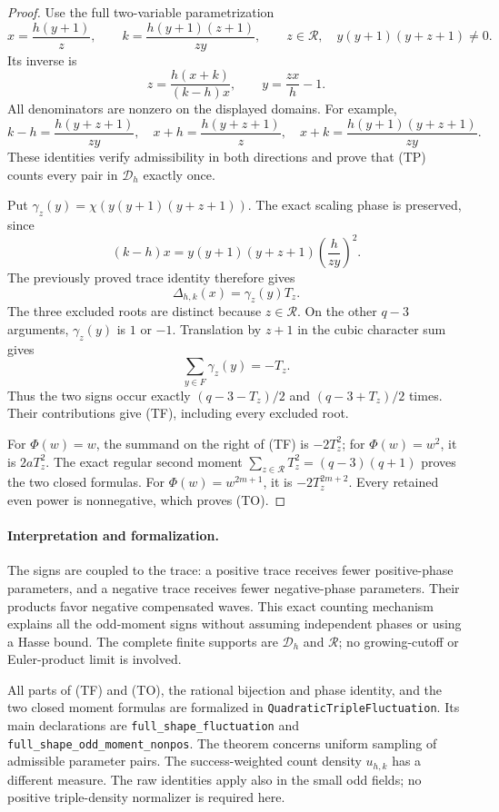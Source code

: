 \documentclass[11pt]{article}
\begin{document}
\begin{proof}
Use the full two-variable parametrization
\[
 x=\frac{h(y+1)}z,\qquad
 k=\frac{h(y+1)(z+1)}{zy},
 \qquad z\in\mathcal R,\quad y(y+1)(y+z+1)\ne0.
 \tag{TP}
\]
Its inverse is
\[
 z=\frac{h(x+k)}{(k-h)x},\qquad y=\frac{zx}{h}-1.
\]
All denominators are nonzero on the displayed domains.
For example,
\[
 k-h=\frac{h(y+z+1)}{zy},\quad
 x+h=\frac{h(y+z+1)}z,\quad
 x+k=\frac{h(y+1)(y+z+1)}{zy}.
\]
These identities verify admissibility in both directions and prove
that (TP) counts every pair in \(\mathcal D_h\) exactly once.

Put \(\gamma_z(y)=\chi(y(y+1)(y+z+1))\). The exact scaling phase
is preserved, since
\[
 (k-h)x=y(y+1)(y+z+1)\left(\frac h{zy}\right)^2.
\]
The previously proved trace identity therefore gives
\[
                 \Delta_{h,k}(x)=\gamma_z(y)T_z.
\]
The three excluded roots are distinct because \(z\in\mathcal R\).
On the other \(q-3\) arguments, \(\gamma_z(y)\) is \(1\) or \(-1\).
Translation by \(z+1\) in the cubic character sum gives
\[
              \sum_{y\in F}\gamma_z(y)=-T_z.
\]
Thus the two signs occur exactly
\((q-3-T_z)/2\) and \((q-3+T_z)/2\) times.
Their contributions give (TF), including every excluded root.

For \(\Phi(w)=w\), the summand on the right of (TF) is
\(-2T_z^2\); for \(\Phi(w)=w^2\), it is \(2aT_z^2\).
The exact regular second moment
\(\sum_{z\in\mathcal R}T_z^2=(q-3)(q+1)\) proves the two
closed formulas. For \(\Phi(w)=w^{2m+1}\), it is
\(-2T_z^{2m+2}\). Every retained even power is nonnegative,
which proves (TO).
\end{proof}

\paragraph{Interpretation and formalization.}
The signs are coupled to the trace: a positive trace receives fewer
positive-phase parameters, and a negative trace receives fewer
negative-phase parameters. Their products favor negative compensated
waves. This exact counting mechanism explains all the odd-moment
signs without assuming independent phases or using a Hasse bound.
The complete finite supports are \(\mathcal D_h\) and \(\mathcal R\);
no growing-cutoff or Euler-product limit is involved.

All parts of (TF) and (TO), the rational bijection and phase identity,
and the two closed moment formulas are formalized in
\texttt{QuadraticTripleFluctuation}. Its main declarations are
\texttt{full\_shape\_fluctuation} and
\texttt{full\_shape\_odd\_moment\_nonpos}.
The theorem concerns uniform sampling of admissible parameter pairs.
The success-weighted count density \(u_{h,k}\) has a different measure.
The raw identities apply also in the small odd fields; no positive
triple-density normalizer is required here.
\end{document}
